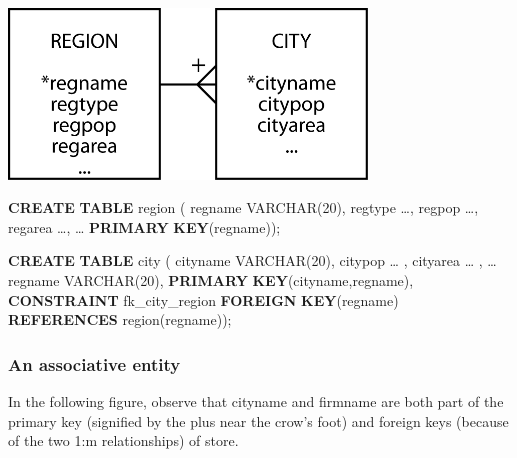 \documentclass[
]{article}
\newenvironment{Shaded}{\begin{snugshade}}{\end{snugshade}}
\newcommand{\DataTypeTok}[1]{\textcolor[rgb]{0.13,0.29,0.53}{#1}}
\newcommand{\DecValTok}[1]{\textcolor[rgb]{0.00,0.00,0.81}{#1}}
\newcommand{\KeywordTok}[1]{\textcolor[rgb]{0.13,0.29,0.53}{\textbf{#1}}}
\newcommand{\NormalTok}[1]{#1}
\begin{document}
\includegraphics[width=3.75in,height=\textheight]{Figures/Chapter 7/region-city.png}

\begin{Shaded}
\begin{Highlighting}[]
\KeywordTok{CREATE} \KeywordTok{TABLE}\NormalTok{ region (}
\NormalTok{    regname     }\DataTypeTok{VARCHAR}\NormalTok{(}\DecValTok{20}\NormalTok{),}
\NormalTok{    regtype     …,}
\NormalTok{    regpop       …,}
\NormalTok{    regarea      …,}
\NormalTok{        … }
        \KeywordTok{PRIMARY} \KeywordTok{KEY}\NormalTok{(regname));}
\end{Highlighting}
\end{Shaded}

\begin{Shaded}
\begin{Highlighting}[]
\KeywordTok{CREATE} \KeywordTok{TABLE}\NormalTok{ city (}
\NormalTok{    cityname        }\DataTypeTok{VARCHAR}\NormalTok{(}\DecValTok{20}\NormalTok{),}
\NormalTok{    citypop     … ,}
\NormalTok{    cityarea        … ,}
\NormalTok{    …}
\NormalTok{    regname     }\DataTypeTok{VARCHAR}\NormalTok{(}\DecValTok{20}\NormalTok{),}
        \KeywordTok{PRIMARY} \KeywordTok{KEY}\NormalTok{(cityname,regname),  }
        \KeywordTok{CONSTRAINT}\NormalTok{ fk\_city\_region}
            \KeywordTok{FOREIGN} \KeywordTok{KEY}\NormalTok{(regname) }\KeywordTok{REFERENCES}\NormalTok{ region(regname));}
\end{Highlighting}
\end{Shaded}

\hypertarget{an-associative-entity}{%
\subsubsection*{An associative entity}\label{an-associative-entity}}

In the following figure, observe that cityname and firmname are both
part of the primary key (signified by the plus near the crow's foot) and
foreign keys (because of the two 1:m relationships) of store.
\end{document}
